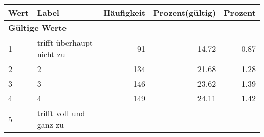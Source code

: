      \begin{longtable}{lXrrr}
     \toprule
     \textbf{Wert} & \textbf{Label} & \textbf{Häufigkeit} & \textbf{Prozent(gültig)} & \textbf{Prozent} \\
     \endhead
     \midrule
     \multicolumn{5}{l}{\textbf{Gültige Werte}}\\

     1 &
     \multicolumn{1}{X}{ trifft überhaupt nicht zu   } &


       \num{91} &
       \num[round-mode=places,round-precision=2]{14,72} &
         \num[round-mode=places,round-precision=2]{0,87} \\

     2 &
     \multicolumn{1}{X}{ 2   } &


       \num{134} &
       \num[round-mode=places,round-precision=2]{21,68} &
         \num[round-mode=places,round-precision=2]{1,28} \\

     3 &
     \multicolumn{1}{X}{ 3   } &


       \num{146} &
       \num[round-mode=places,round-precision=2]{23,62} &
         \num[round-mode=places,round-precision=2]{1,39} \\

     4 &
     \multicolumn{1}{X}{ 4   } &


       \num{149} &
       \num[round-mode=places,round-precision=2]{24,11} &
         \num[round-mode=places,round-precision=2]{1,42} \\

     5 &
     \multicolumn{1}{X}{ trifft voll und ganz zu   } &



\end{longtable}
